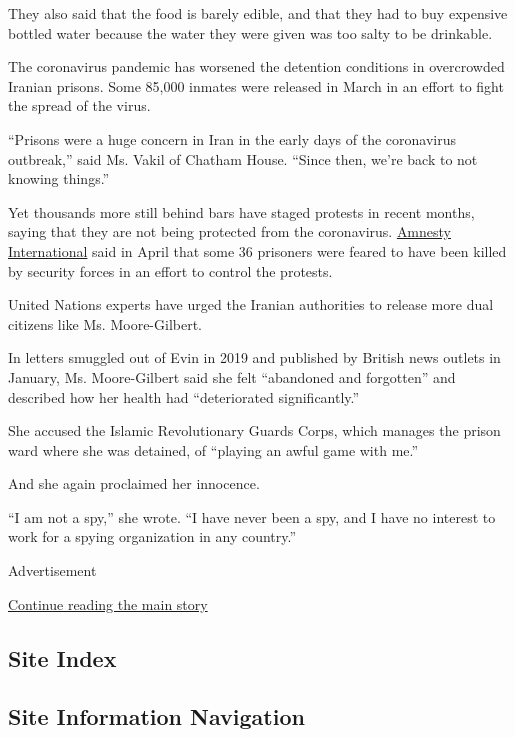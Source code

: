 They also said that the food is barely edible, and that they had to buy
expensive bottled water because the water they were given was too salty
to be drinkable.

The coronavirus pandemic has worsened the detention conditions in
overcrowded Iranian prisons. Some 85,000 inmates were released in March
in an effort to fight the spread of the virus.

``Prisons were a huge concern in Iran in the early days of the
coronavirus outbreak,'' said Ms. Vakil of Chatham House. ``Since then,
we're back to not knowing things.''

Yet thousands more still behind bars have staged protests in recent
months, saying that they are not being protected from the coronavirus.
\href{https://www.amnesty.org/en/latest/news/2020/04/iran-prisoners-killed-by-security-forces-during-covid19-pandemic-protests/}{Amnesty
International} said in April that some 36 prisoners were feared to have
been killed by security forces in an effort to control the protests.

United Nations experts have urged the Iranian authorities to release
more dual citizens like Ms. Moore-Gilbert.

In letters smuggled out of Evin in 2019 and published by British news
outlets in January, Ms. Moore-Gilbert said she felt ``abandoned and
forgotten'' and described how her health had ``deteriorated
significantly.''

She accused the Islamic Revolutionary Guards Corps, which manages the
prison ward where she was detained, of ``playing an awful game with
me.''

And she again proclaimed her innocence.

``I am not a spy,'' she wrote. ``I have never been a spy, and I have no
interest to work for a spying organization in any country.''

Advertisement

\protect\hyperlink{after-bottom}{Continue reading the main story}

\hypertarget{site-index}{%
\subsection{Site Index}\label{site-index}}

\hypertarget{site-information-navigation}{%
\subsection{Site Information
Navigation}\label{site-information-navigation}}

